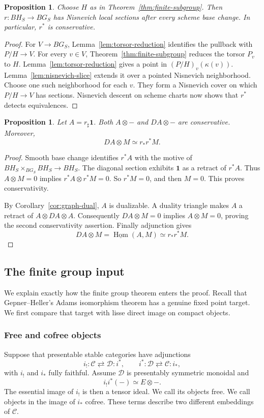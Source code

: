 \documentclass[11pt,reqno]{amsart}
\newtheorem{proposition}[theorem]{Proposition}
\theoremstyle{definition}
\theoremstyle{remark}
\theoremstyle{plain}
\numberwithin{equation}{section}
\newcommand{\one}{\mathbf 1}
\newcommand{\Hom}{\underline{\operatorname{Hom}}}
\newcommand{\C}{\mathcal C}
\newcommand{\D}{\mathcal D}
\begin{document}
\begin{proposition}\label{prop:nis-reduction}
Choose \(H\) as in Theorem~\ref{thm:finite-subgroup}.
Then \(r:BH_S\to BG_S\) has Nisnevich local sections after every scheme base change.
In particular, \(r^*\) is conservative.
\end{proposition}
\begin{proof}
For \(V\to BG_S\), Lemma~\ref{lem:torsor-reduction} identifies the pullback with \(P/H\to V\).
For every \(v\in V\), Theorem~\ref{thm:finite-subgroup} reduces the torsor \(P_v\) to \(H\).
Lemma~\ref{lem:torsor-reduction} gives a point in \((P/H)_v(\kappa(v))\).
Lemma~\ref{lem:nisnevich-slice} extends it over a pointed Nisnevich neighborhood.
Choose one such neighborhood for each \(v\).
They form a Nisnevich cover on which \(P/H\to V\) has sections.
Nisnevich descent on scheme charts now shows that \(r^*\) detects equivalences.
\end{proof}

\begin{proposition}\label{prop:tensor-detect}
Let \(A=r_\sharp\one\).
Both \(A\otimes-\) and \(DA\otimes-\) are conservative.
Moreover,
\[
 DA\otimes M\simeq r_*r^*M.
\]
\end{proposition}
\begin{proof}
Smooth base change identifies \(r^*A\) with the motive of
\(BH_S\times_{BG_S}BH_S\to BH_S\).
The diagonal section exhibits \(\one\) as a retract of \(r^*A\).
Thus \(A\otimes M=0\) implies \(r^*A \otimes r^*M = 0\).
So \(r^*M=0\), and then \(M=0\).
This proves conservativity.

By Corollary~\ref{cor:graph-dual}, \(A\) is dualizable.
A duality triangle makes \(A\) a retract of \(A\otimes DA\otimes A\).
Consequently \(DA\otimes M=0\) implies \(A\otimes M=0\), proving the second conservativity assertion.
Finally adjunction gives
\[
 DA\otimes M=\Hom(A,M)\simeq r_*r^*M.
\]
\end{proof}


\subsection{The finite group input}\label{sec:finite}

We explain exactly how the finite group theorem enters the proof.
Recall that Gepner--Heller's Adams isomorphism theorem has a genuine fixed point target.
We first compare that target with lisse direct image on compact objects.

\subsubsection*{Free and cofree objects}
Suppose that presentable stable categories have adjunctions
\[
 i_!:\C\rightleftarrows\D:i^*,\qquad i^*:\D\rightleftarrows\C:i_*,
\]
with \(i_!\) and \(i_*\) fully faithful.
Assume \(\D\) is presentably symmetric monoidal and
\[
 i_!i^*(-)\simeq E\otimes-.
\]
The essential image of \(i_!\) is then a tensor ideal.
We call its objects free.
We call objects in the image of \(i_*\) cofree.
These terms describe two different embeddings of \(\C\).
\end{document}
